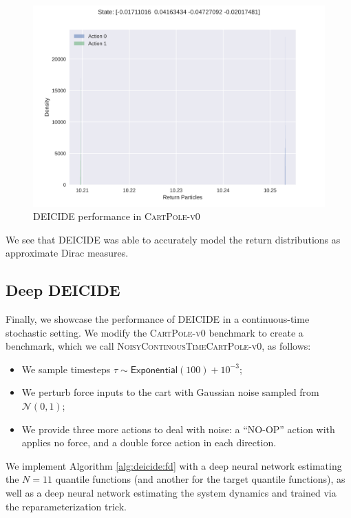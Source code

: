 \begin{figure}[h]
  \centering
  \includegraphics[scale=0.8]{results/ct51-cartpole-deterministic-returns}
  \caption[DEICIDE performance in a deterministic setting]{DEICIDE
    performance in \textsc{CartPole-v0}} 
  \label{fig:exp:cartpole:deterministic}
\end{figure}

We see that DEICIDE was able to accurately model the return
distributions as approximate Dirac measures.

\subsection{Deep DEICIDE}
Finally, we showcase the performance of DEICIDE in a continuous-time
stochastic setting. We modify the \textsc{CartPole-v0} benchmark
\citep{brockman2016openai} to create a benchmark, which we call
\textsc{NoisyContinousTimeCartPole-v0}, as follows:

\begin{itemize}
\item We sample timesteps $\tau\sim\mathsf{Exponential}(100) +
  10^{-3}$;
\item We perturb force inputs to the cart with Gaussian noise sampled
  from $\mathcal{N}(0, 1)$;
\item We provide three more actions to deal with noise: a ``NO-OP''
  action with applies no force, and a double force action in each direction.
\end{itemize}

We implement Algorithm \ref{alg:deicide:fd} with a deep neural network
estimating the $N=11$ quantile functions (and another for the target quantile
functions), as well as a deep neural network estimating the system
dynamics and trained via the reparameterization trick.

